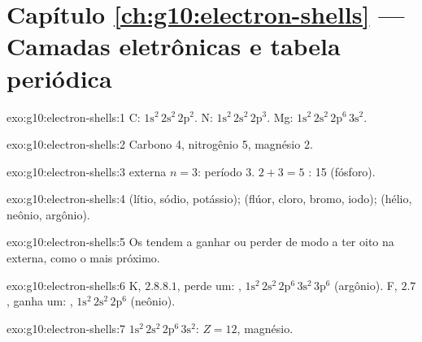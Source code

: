 \section*{Capítulo \ref{ch:g10:electron-shells} --- Camadas eletrônicas e tabela periódica}

\begin{solution}{exo:g10:electron-shells:1}
C: $1\mathrm{s}^2\,2\mathrm{s}^2\,2\mathrm{p}^2$. N:
$1\mathrm{s}^2\,2\mathrm{s}^2\,2\mathrm{p}^3$. Mg:
$1\mathrm{s}^2\,2\mathrm{s}^2\,2\mathrm{p}^6\,3\mathrm{s}^2$.
\end{solution}

\begin{solution}{exo:g10:electron-shells:2}
Carbono 4, nitrogênio 5, magnésio 2.
\end{solution}

\begin{solution}{exo:g10:electron-shells:3}
 externa $n = 3$: período 3. $2 + 3 = 5$ :
 15 (fósforo).
\end{solution}

\begin{solution}{exo:g10:electron-shells:4}
 (lítio, sódio, potássio);  (flúor, cloro,
bromo, iodo);  (hélio, neônio, argônio).
\end{solution}

\begin{solution}{exo:g10:electron-shells:5}
Os  tendem a ganhar ou perder  de modo a ter oito 
na  externa, como o  mais próximo.
\end{solution}

\begin{solution}{exo:g10:electron-shells:6}
K, $2.8.8.1$, perde um: ,
$1\mathrm{s}^2\,2\mathrm{s}^2\,2\mathrm{p}^6\,3\mathrm{s}^2\,3\mathrm{p}^6$
(argônio). F, $2.7$, ganha um: ,
$1\mathrm{s}^2\,2\mathrm{s}^2\,2\mathrm{p}^6$ (neônio).
\end{solution}

\begin{solution}{exo:g10:electron-shells:7}
$1\mathrm{s}^2\,2\mathrm{s}^2\,2\mathrm{p}^6\,3\mathrm{s}^2$: $Z = 12$,
magnésio.
\end{solution}

